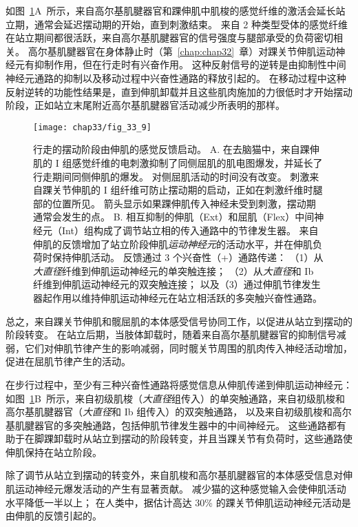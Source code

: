 如图~\ref{fig:33_9}A~所示，来自高尔基肌腱器官和踝伸肌中肌梭的感觉纤维的激活会延长站立期，通常会延迟摆动期的开始，直到刺激结束。
来自 2 种类型受体的感觉纤维在站立期间都很活跃，来自高尔基肌腱器官的信号强度与腿部承受的负荷密切相关。
高尔基肌腱器官在身体静止时（第~\ref{chap:chap32}~章）对踝关节伸肌运动神经元有抑制作用，但在行走时有兴奋作用。
这种反射信号的逆转是由抑制性中间神经元通路的抑制以及移动过程中兴奋性通路的释放引起的。
在移动过程中这种反射逆转的功能性结果是，直到伸肌卸载并且这些肌肉施加的力很低时才开始摆动阶段，正如站立末尾附近高尔基肌腱器官活动减少所表明的那样。


\begin{figure}[htbp]
	\centering
	\texttt{[image: chap33/fig\_33\_9]}
	\caption{行走的摆动阶段由伸肌的感觉反馈启动。
		A. 在去脑猫中，来自踝伸肌的 I 组感觉纤维的电刺激抑制了同侧屈肌的肌电图爆发，并延长了行走期间同侧伸肌的爆发。
		对侧屈肌活动的时间没有改变。
		刺激来自踝关节伸肌的 I 组纤维可防止摆动期的启动，正如在刺激纤维时腿部的位置所见。
		箭头显示如果踝伸肌传入神经未受到刺激，摆动期通常会发生的点\cite{whelan1995stimulation}。
		B. 相互抑制的伸肌（Ext）和屈肌（Flex）中间神经元（Int）组构成了调节站立相的传入通路中的节律发生器。
		来自伸肌的反馈增加了站立阶段伸肌\textit{运动神经元}的活动水平，并在伸肌负荷时保持伸肌活动。
		反馈通过 3 个兴奋性（+）通路传递：
		（1）从\textit{大直径}纤维到伸肌运动神经元的单突触连接；
		（2）从\textit{大直径}和 Ib 纤维到伸肌运动神经元的双突触连接；
		以及（3）通过伸肌节律发生器起作用以维持伸肌运动神经元在站立相活跃的多突触兴奋性通路。}
	\label{fig:33_9}
\end{figure}


总之，来自踝关节伸肌和髋屈肌的本体感受信号协同工作，以促进从站立到摆动的阶段转变。
在站立后期，当肢体卸载时，随着来自高尔基肌腱器官的抑制信号减弱，它们对伸肌节律产生的影响减弱，同时髋关节周围的肌肉传入神经活动增加，促进在屈肌节律产生的活动。


在步行过程中，至少有三种兴奋性通路将感觉信息从伸肌传递到伸肌运动神经元：
如图~\ref{fig:33_9}B~所示，来自初级肌梭（\textit{大直径}组传入）的单突触通路，来自初级肌梭和高尔基肌腱器官（\textit{大直径}和 Ib 组传入）的双突触通路， 以及来自初级肌梭和高尔基肌腱器官的多突触通路，包括伸肌节律发生器中的中间神经元。
这些通路都有助于在脚踝卸载时从站立到摆动的阶段转变，并且当踝关节有负荷时，这些通路使伸肌保持在站立阶段。


除了调节从站立到摆动的转变外，来自肌梭和高尔基肌腱器官的本体感受信息对伸肌运动神经元爆发活动的产生有显著贡献。
减少猫的这种感觉输入会使伸肌活动水平降低一半以上；
在人类中，据估计高达 30\% 的踝关节伸肌运动神经元活动是由伸肌的反馈引起的。



